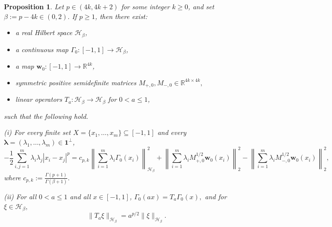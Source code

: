 \documentclass[11pt]{article}
\newtheorem{prop}[theorem]{Proposition}
\theoremstyle{definition}
\begin{document}
\begin{prop}\label{prop:zero-anchored-exact-bridge-log}
Let $p\in(4k,4k+2)$ for some integer $k\geq 0$, and set
	\(
	\beta:=p-4k\in(0,2).
	\)
	If $p\geq 1$,
then there exist:
\begin{itemize}
\item a real Hilbert space $\mathcal H_\beta$,
\item a continuous map $\Gamma_0:[-1,1]\to \mathcal H_\beta$,
\item a map $\boldsymbol w_0:[-1,1]\to \mathbb R^{4k}$,
\item symmetric positive semidefinite matrices
\(
M_{+,0},M_{-,0}\in\mathbb R^{4k\times 4k},
\)
\item linear operators $T_a:\mathcal H_\beta\to\mathcal H_\beta$ for $0<a\le 1$,
\end{itemize}
such that the following hold.

\medskip
\noindent
\textnormal{(i)}
For every finite set $X=\{x_1,\dots,x_m\}\subseteq [-1,1]$ and every
$\boldsymbol\lambda=(\lambda_1,\dots,\lambda_m)\in \boldsymbol{1}^{\perp}$,
\[
-\frac12\sum_{i,j=1}^m \lambda_i\lambda_j |x_i-x_j|^p
=
c_{p,k}\left\|\sum_{i=1}^m \lambda_i\Gamma_0(x_i)\right\|_{\mathcal H_\beta}^2 +
\left\|\sum_{i=1}^m \lambda_i M_{+,0}^{1/2}\boldsymbol w_0(x_i)\right\|_2^2
-
\left\|\sum_{i=1}^m \lambda_i M_{-,0}^{1/2}\boldsymbol w_0(x_i)\right\|_2^2,
\]
where
\(
c_{p,k}:=\frac{\Gamma(p+1)}{\Gamma(\beta+1)}.
\)

\medskip
\noindent
\textnormal{(ii)}
For all $0<a\le 1$ and all $x\in[-1,1]$,
\(
\Gamma_0(ax)=T_a\Gamma_0(x),
\)
and for \(\xi\in\mathcal H_\beta,\)
\[
\|T_a\xi\|_{\mathcal H_\beta}=a^{p/2}\|\xi\|_{\mathcal H_\beta}.
\]
\end{prop}
\end{document}
